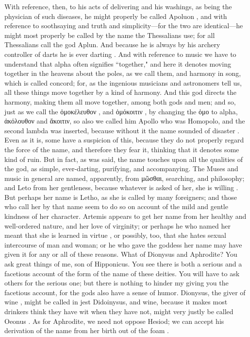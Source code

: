 {{With reference, then, to his acts of delivering and his washings,  as being the physician of such diseases, he might properly be called Apoluon , and with reference to soothsaying and truth and simplicity—for the two are identical—he might most properly be called by the name the Thessalians use; for all Thessalians call the god Aplun. And because he is always by his archery controller of darts  he is ever darting . And with reference to music we have to understand that alpha often signifies ``together," and here it denotes moving together in the heavens about the poles, as we call them, and harmony in song,  which is called concord; for, as the ingenious musicians and astronomers tell us, all these things move together by a kind of harmony. And this god directs the harmony, making them all move together, among both gods and men; and so, just as we call the ὁμοκέλευθον , and ὁμόκοιτιν , by changing the ὁμο to alpha, ἀκόλουθον and ἄκοιτιν, so also we called him Apollo who was Homopolo,  and the second lambda was inserted, because without it the name sounded of disaster . Even as it is, some have a suspicion of this, because they do not properly regard the force of the name, and therefore they fear it, thinking that it denotes some kind of ruin. But in fact, as was said,  the name touches upon all the qualities of the god, as simple, ever-darting, purifying, and accompanying. The Muses and music in general are named, apparently, from μῶσθαι, searching, and philosophy; and Leto from her gentleness, because whatever is asked of her, she is willing . But perhaps her name is Letho, as she is called by many foreigners; and those who call her by that name seem to do so  on account of the mild and gentle  kindness of her character. Artemis appears to get her name from her healthy  and well-ordered nature, and her love of virginity; or perhaps he who named her meant that she is learned in virtue , or possibly, too, that she hates sexual intercourse  of man and woman; or he who gave the goddess her name may have given it for any or all of these reasons.
\hermogenesspeaks
What of Dionysus and Aphrodite?
\socratesspeaks
You ask great things of me, son of Hipponicus. You see there is both a serious and a facetious account of the form  of the name of these deities. You will have to ask others for the serious one; but there is nothing to hinder my giving you the facetious account, for the gods also have a sense of humor. Dionysus, the giver  of wine , might be called in jest Didoinysus, and wine, because it makes most drinkers think  they have wit  when they have not, might very justly be called Oeonus . As for Aphrodite, we need not oppose Hesiod; we can accept his derivation of the name  from her birth out of the foam .
}}
